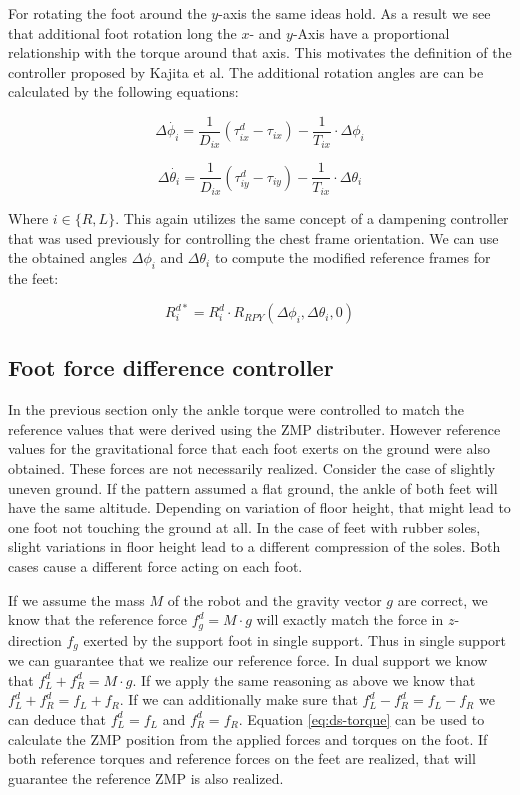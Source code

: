 \documentclass[english,ngerman]{KITreprt}
\begin{document}
For rotating the foot around the $y$-axis the same ideas hold. As a
result we see that additional foot rotation long the $x$- and $y$-Axis
have a proportional relationship with the torque around that axis. This
motivates the definition of the controller proposed by Kajita et al. The
additional rotation angles are can be calculated by the following
equations:

\begin{equation}
\Delta \dot{\phi_i} = \frac{1}{D_{ix}} (\tau^d_{ix} - \tau_{ix}) - \frac{1}{T_{ix}} \cdot \Delta \phi_i
\end{equation}

\begin{equation}
\Delta \dot{\theta_i} = \frac{1}{D_{ix}} (\tau^d_{iy} - \tau_{iy}) - \frac{1}{T_{ix}} \cdot \Delta \theta_i
\end{equation}

Where $i \in \{R, L\}$. This again utilizes the same concept of a
dampening controller that was used previously for controlling the chest
frame orientation. We can use the obtained angles $\Delta \phi_i$ and
$\Delta \theta_i$ to compute the modified reference frames for the feet:

\begin{equation}
R^{d*}_i = R^d_i \cdot R_{RPY}(\Delta \phi_i, \Delta \theta_i, 0)
\end{equation}

\subsection{Foot force difference
controller}\label{foot-force-difference-controller}

In the previous section only the ankle torque were controlled to match
the reference values that were derived using the ZMP distributer.
However reference values for the gravitational force that each foot
exerts on the ground were also obtained. These forces are not
necessarily realized. Consider the case of slightly uneven ground. If
the pattern assumed a flat ground, the ankle of both feet will have the
same altitude. Depending on variation of floor height, that might lead
to one foot not touching the ground at all. In the case of feet with
rubber soles, slight variations in floor height lead to a different
compression of the soles. Both cases cause a different force acting on
each foot.

If we assume the mass $M$ of the robot and the gravity vector $g$ are
correct, we know that the reference force $f^d_g = M \cdot g$ will
exactly match the force in $z$-direction $f_g$ exerted by the support
foot in single support. Thus in single support we can guarantee that we
realize our reference force. In dual support we know that
$f^d_L + f^d_R = M \cdot g$. If we apply the same reasoning as above we
know that $f^d_L + f^d_R = f_L + f_R$. If we can additionally make sure
that $f^d_L - f^d_R = f_L - f_R$ we can deduce that $f^d_L = f_L$ and
$f^d_R = f_R$. Equation \ref{eq:ds-torque} can be used to calculate the
ZMP position from the applied forces and torques on the foot. If both
reference torques and reference forces on the feet are realized, that
will guarantee the reference ZMP is also realized.
\end{document}
